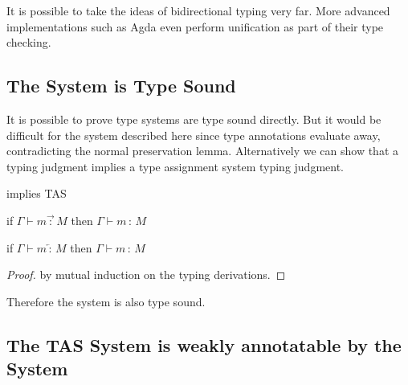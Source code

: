  
It is possible to take the ideas of bidirectional typing very far.
More advanced \bidir{} implementations such as Agda\cite{norell2007towards} even perform unification as part of their \bidir{} type checking.
 
\subsection{The \Bidir{} System is Type Sound}
 
It is possible to prove \bidir{} type systems are type sound directly\cite{nanevski2005dependent}.
But it would be difficult for the system described here since type annotations evaluate away, contradicting the normal preservation lemma.
Alternatively we can show that a \bidir{} typing judgment implies a type assignment system typing judgment.
 
\begin{thm}
\Bidir{} implies \ac{TAS}
 
if $\Gamma\vdash m\overrightarrow{\,:\,}M$ then $\Gamma\vdash m\,:\,M$
 
if $\Gamma\vdash m\overleftarrow{\,:\,}M$ then $\Gamma\vdash m\,:\,M$
\end{thm}
 
\begin{proof}
by mutual induction on the \bidir{} typing derivations.
\end{proof}
Therefore the \bidir{} system is also type sound.
 
\subsection{The \ac{TAS} System is weakly annotatable by the \Bidir{} System}
 
